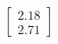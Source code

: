 \documentclass[preview]{standalone}
\begin{document}
\begin{align*}
\begin{bmatrix} 2.18 \\ 2.71 \end{bmatrix}
\end{align*}
\end{document}
